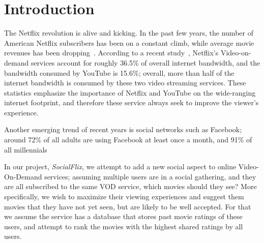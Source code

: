 \section{Introduction}
\label{sec:intro}

The Netflix revolution is alive and kicking. 
In the past few years, the number of American Netflix subscribers has been on a constant climb, while average movie revenues has been dropping~\cite{MisixNetflix}.
According to a recent study~\cite{VarietyNetflixBandwidth}, Netflix's Video-on-demand services account for roughly 36.5\% of overall internet bandwidth, and the bandwidth consumed by YouTube is 15.6\%; overall, more than half of the internet bandwidth is consumed by these two video streaming services.
These statistics emphasize the importance of Netflix and YouTube on the wide-ranging internet footprint, and therefore these service always seek to improve the viewer's experience.

Another emerging trend of recent years is social networks such as Facebook; around 72\% of all adults are using Facebook at least once a month, and 91\% of all millennials~\cite{FacebookStats}

In our project, \textit{SocialFlix}, we attempt to add a new social aspect to online Video-On-Demand services; assuming multiple users are in a social gathering, and they are all subscribed to the same VOD service, which movies should they see?
More specifically, we wish to maximize their viewing experiences and suggest them movies that they have not yet seen, but are likely to be well accepted.
For that we assume the service has a database that stores past movie ratings of these users, and attempt to rank the movies with the highest shared ratings by all users.